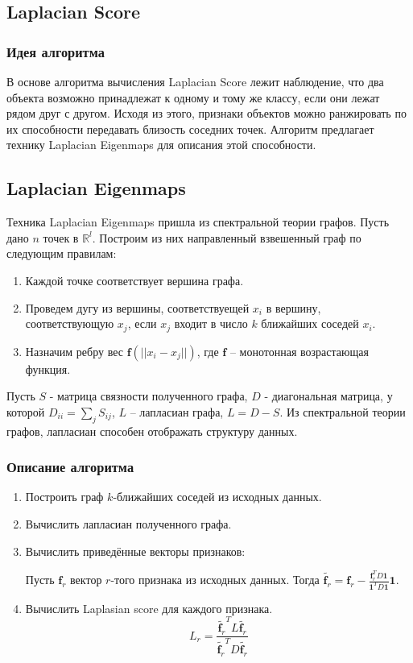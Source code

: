\subsection{Laplacian Score}

\subsubsection{Идея алгоритма}

В основе алгоритма вычисления Laplacian Score лежит наблюдение, что два объекта возможно принадлежат к одному и тому же классу,
если они лежат рядом друг с другом. Исходя из этого, признаки объектов можно ранжировать по их способности передавать близость соседних точек. Алгоритм предлагает технику Laplacian Eigenmaps для описания этой способности\cite{he2005laplacian}. 

\subsection{Laplacian Eigenmaps}

Техника Laplacian Eigenmaps пришла из спектральной теории графов. Пусть дано $n$ точек в $\mathbb{R}^l$. Построим из них направленный
взвешенный граф по следующим правилам:
\begin{enumerate}
	\item Каждой точке соответствует вершина графа.
	\item Проведем дугу из вершины, соответствуещей $x_i$ в вершину, соответствующую $x_j$, если $x_j$ входит в число $k$ ближайших соседей
	$x_i$.
	\item Назначим ребру вес $\mathbf{f}(||x_i - x_j||)$, где $\mathbf{f}$ -- монотонная возрастающая функция.
\end{enumerate}
Пусть $S$ - матрица связности полученного графа, $D$  - диагональная матрица, у которой $D_{ii} = \sum_j S_{ij}$, $L$ -- лапласиан графа, $L = D-S$. Из спектральной теории графов, лапласиан способен отображать структуру данных\cite{belkin2003laplacian}.

\subsubsection{Описание алгоритма}

\begin{enumerate}
	\item Построить граф $k$-ближайших соседей из исходных данных. 
	\item Вычислить лапласиан полученного графа.
	\item Вычислить приведённые векторы признаков: 

	Пусть $\mathbf{f}_r$ вектор $r$-того признака из исходных данных. Тогда $\widetilde{\mathbf{f}_r} = \mathbf{f}_r - \frac{\mathbf{f}_r^T D \mathbf{1}}{\mathbf{1}^T D \mathbf{1}} \mathbf{1}$.
	\item Вычислить Laplasian score для каждого признака.
	\[L_r = \frac{\widetilde{\mathbf{f}_r}^T L \widetilde{\mathbf{f}_r}}{\widetilde{\mathbf{f}_r}^T D \widetilde{\mathbf{f}_r}}\]
\end{enumerate}

